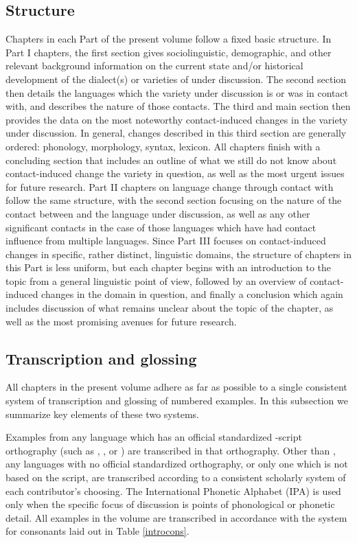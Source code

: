 \documentclass[output=paper]{langsci/langscibook}
\begin{document}
\subsection{Structure}
Chapters in each Part of the present volume follow a fixed basic structure. In Part I chapters, the first section gives sociolinguistic, demographic, and other relevant background information on the current state and/or historical development of the dialect(s) or varieties of  under discussion. The second section then details the languages which the variety under discussion is or was in contact with, and describes the nature of those contacts. The third and main section then provides the data on the most noteworthy contact-induced changes in the variety under discussion. In general, changes described in this third section are generally ordered: phonology, morphology, syntax, lexicon. All chapters finish with a concluding section that includes an outline of what we still do not know about contact-induced change the variety in question, as well as the most urgent issues for {future} research. Part II chapters on {language change} through contact with  follow the same structure, with the second section {focusing} on the nature of the contact between  and the language under discussion, as well as any other significant contacts in the case of those languages which have had contact influence from multiple languages. Since Part III focuses on contact-induced changes in specific, rather distinct, linguistic domains, the structure of chapters in this Part is less uniform, but each chapter begins with an introduction to the topic from a general linguistic point of view, followed by an overview of contact-induced changes in the domain in question, and finally a conclusion which again includes discussion of what remains unclear about the topic of the chapter, as well as the most promising avenues for {future} research.

\subsection{Transcription and glossing}

All chapters in the present volume adhere as far as possible to a single consistent system of transcription and glossing of numbered examples. In this subsection we summarize key elements of these two systems.


Examples from any language which has an official standardized -script {orthography} (such as , , or ) are transcribed in that {orthography}. Other than , any languages with no official standardized {orthography}, or only one which is not based on the  script, are transcribed according to a consistent scholarly system of each contributor's choosing. The International Phonetic Alphabet (IPA) is used only when the specific focus of discussion is points of phonological or phonetic detail. All  examples in the volume are transcribed in accordance with the system for consonants laid out in Table \ref{introcons}.
\end{document}

